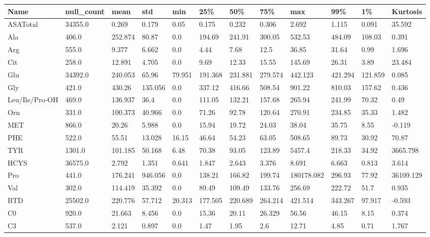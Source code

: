 \begin{tabular}{|l|l|l|l|l|l|l|l|l|l|l|l|}
\toprule
Name & null_count & mean & std & min & 25\% & 50\% & 75\% & max & 99\% & 1\% & Kurtosis \\
\midrule

ASATotal & 34355.0 & 0.269 & 0.179 & 0.05 & 0.175 & 0.232 & 0.306 & 2.692 & 1.115 & 0.091 & 35.592 \\
Ala & 406.0 & 252.874 & 80.87 & 0.0 & 194.69 & 241.91 & 300.05 & 532.53 & 484.09 & 108.03 & 0.391 \\
Arg & 555.0 & 9.377 & 6.662 & 0.0 & 4.44 & 7.68 & 12.5 & 36.85 & 31.64 & 0.99 & 1.696 \\
Cit & 258.0 & 12.891 & 4.705 & 0.0 & 9.69 & 12.33 & 15.55 & 145.69 & 26.31 & 3.89 & 23.484 \\
Glu & 34392.0 & 240.053 & 65.96 & 79.951 & 191.368 & 231.881 & 279.574 & 442.123 & 421.294 & 121.859 & 0.085 \\
Gly & 421.0 & 430.26 & 135.056 & 0.0 & 337.12 & 416.66 & 508.54 & 901.22 & 810.03 & 157.62 & 0.436 \\
Leu/Ile/Pro-OH & 469.0 & 136.937 & 36.4 & 0.0 & 111.05 & 132.21 & 157.68 & 265.94 & 241.99 & 70.32 & 0.49 \\
Orn & 331.0 & 100.373 & 40.966 & 0.0 & 71.26 & 92.78 & 120.64 & 270.91 & 234.85 & 35.33 & 1.482 \\
MET & 866.0 & 20.26 & 5.988 & 0.0 & 15.94 & 19.72 & 24.03 & 38.04 & 35.75 & 8.55 & -0.119 \\
PHE & 522.0 & 55.51 & 13.028 & 16.15 & 46.64 & 54.23 & 63.05 & 508.65 & 89.73 & 30.92 & 70.87 \\
TYR & 1301.0 & 101.185 & 50.168 & 6.48 & 70.38 & 93.05 & 123.89 & 5457.4 & 218.33 & 34.92 & 3665.798 \\
HCYS & 36575.0 & 2.792 & 1.351 & 0.641 & 1.847 & 2.643 & 3.376 & 8.691 & 6.663 & 0.813 & 3.614 \\
Pro & 441.0 & 176.241 & 946.056 & 0.0 & 138.21 & 166.82 & 199.74 & 180178.082 & 296.93 & 77.92 & 36109.129 \\
Val & 302.0 & 114.419 & 35.392 & 0.0 & 89.49 & 109.49 & 133.76 & 256.69 & 222.72 & 51.7 & 0.935 \\
BTD & 25502.0 & 220.776 & 57.712 & 20.313 & 177.505 & 220.689 & 264.214 & 421.514 & 343.267 & 97.917 & -0.593 \\
C0 & 920.0 & 21.663 & 8.456 & 0.0 & 15.36 & 20.11 & 26.329 & 56.56 & 46.15 & 8.15 & 0.374 \\
C3 & 537.0 & 2.121 & 0.897 & 0.0 & 1.47 & 1.95 & 2.6 & 12.71 & 4.85 & 0.71 & 1.767 \\

\end{tabular}
